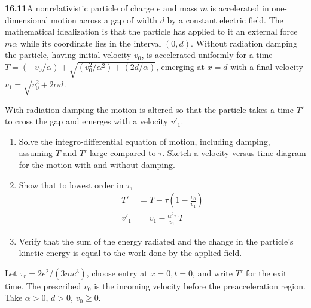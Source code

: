 \par\bigskip
\noindent\textbf{16.11}\quad A nonrelativistic particle of charge $e$ and mass $m$ is accelerated in one-dimensional motion across a gap of width $d$ by a constant electric field. The mathematical idealization is that the particle has applied to it an external force $m\alpha$ while its coordinate lies in the interval $(0,d)$. Without radiation damping the particle, having initial velocity $v_{0}$, is accelerated uniformly for a time $T=(-v_{0}/\alpha)+\sqrt{(v_{0}^{2}/\alpha^{2})+(2d/\alpha)}$, emerging at $x=d$ with a final velocity $v_{1}=\sqrt{v_{0}^{2}+2\alpha d}$.

With radiation damping the motion is altered so that the particle takes a time $T'$ to cross the gap and emerges with a velocity $v'_{1}$.
\begin{enumerate}
\item[(a)] Solve the integro-differential equation of motion, including damping, assuming $T$ and $T'$ large compared to $\tau$. Sketch a velocity-versus-time diagram for the motion with and without damping.
\item[(b)] Show that to lowest order in $\tau$,
\begin{align*}
T'&=T-\tau\!\left(1-\frac{v_{0}}{v_{1}}\right)\\[6pt]
v'_{1}&=v_{1}-\frac{\alpha^{2}\tau}{v_{1}}\,T
\end{align*}
\item[(c)] Verify that the sum of the energy radiated and the change in the particle's kinetic energy is equal to the work done by the applied field.
\end{enumerate}
\solution

Let $\tau_r=2e^2/(3mc^3)$, choose entry at $x=0,t=0$, and write
$T'$ for the exit time. The prescribed $v_0$ is the incoming velocity
before the preacceleration region. Take $\alpha>0$, $d>0$, $v_0\ge0$.

